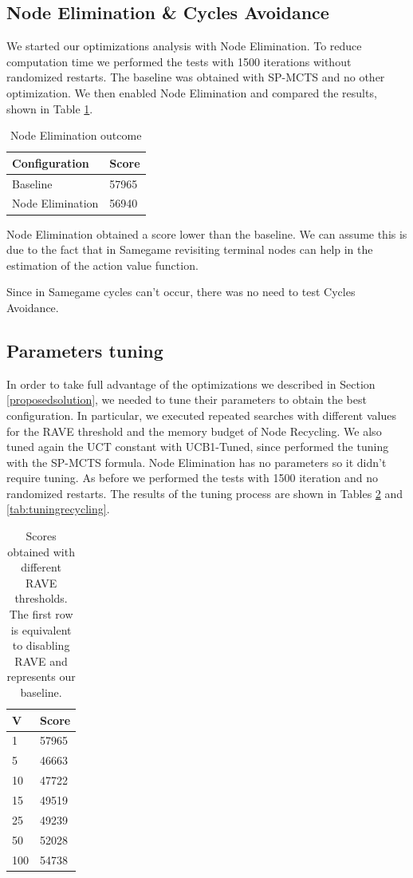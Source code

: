 \subsection{Node Elimination \& Cycles Avoidance}
We started our optimizations analysis with Node Elimination. To reduce computation time we performed the tests with 1500 iterations without randomized restarts. The baseline was obtained with SP-MCTS and no other optimization. We then enabled Node Elimination and compared the results, shown in Table \ref{tab:samegame_nodeelimination}.
\begin{table}[!h]
    \centering
    \begin{tabular}{l|l}
        Configuration & Score\\
        \hline
        Baseline & 57965 \\
        Node Elimination & 56940
    \end{tabular}
    \caption{Node Elimination outcome}
    \label{tab:samegame_nodeelimination}
\end{table}
Node Elimination obtained a score lower than the baseline. We can assume this is due to the fact that in Samegame revisiting terminal nodes can help in the estimation of the action value function.

\medskip\noindent
Since in Samegame cycles can't occur, there was no need to test Cycles Avoidance.

\subsection{Parameters tuning}
In order to take full advantage of the optimizations we described in Section \ref{proposedsolution}, we needed to tune their parameters to obtain the best configuration. In particular, we executed repeated searches with different values for the RAVE threshold and the memory budget of Node Recycling. We also tuned again the UCT constant with UCB1-Tuned, since \cite{DBLP:journals/kbs/SchaddWTU12} performed the tuning with the SP-MCTS formula. Node Elimination has no parameters so it didn't require tuning. As before we performed the tests with 1500 iteration and no randomized restarts. The results of the tuning process are shown in Tables \ref{tab:samegame_tuningrave} and \ref{tab:tuningrecycling}.
\begin{table}[!h]
    \centering
    \begin{tabular}{l|l}
        V & Score \\
        \hline 
        1 & 57965 \\
        5 & 46663 \\
        10 & 47722 \\
        15 & 49519 \\
        25 & 49239 \\
        50 & 52028 \\
        100 & 54738 \\
    \end{tabular}
    \caption[RAVE thresholds scores]{Scores obtained with different RAVE thresholds. The first row is equivalent to disabling RAVE and represents our baseline.}
    \label{tab:samegame_tuningrave}
\end{table}

